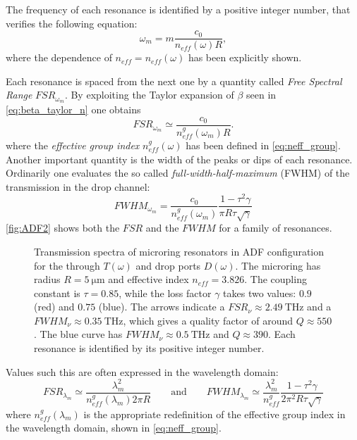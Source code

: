 The frequency of each resonance is identified by a positive integer number, that verifies the following equation:
\begin{equation}
	\omega_m = m\dfrac{c_0}{n_{eff}(\omega)R},
\end{equation}
where the dependence of $n_{eff}=n_{eff}\left(\omega\right)$ has been explicitly shown.

Each resonance is spaced from the next one by a quantity called \textit{Free Spectral Range} $FSR_{\omega_m}$.
By exploiting the Taylor expansion of $\beta$ seen in \cref{eq:beta_taylor_n} one obtains
\begin{equation}
	FSR_{\omega_m} \simeq \dfrac{c_0}{n_{eff}^g\left(\omega_m\right) R} .
\end{equation}
where the \textit{effective group index} $n_{eff}^g\left(\omega\right)$ has been defined in \cref{eq:neff_group}.
Another important quantity is the width of the peaks or dips of each resonance.
Ordinarily one evaluates the so called \textit{full-width-half-maximum} (FWHM) of the transmission in the drop channel:
\begin{equation}
	FWHM_{\omega_m} = \dfrac{c_0}{n_{eff}^g\left(\omega_m\right)}\dfrac{1- \tau^2\gamma}{\pi R \tau \sqrt{\gamma}}
\end{equation}
\autoref{fig:ADF2} shows both the $FSR$ and the $FWHM$ for a family of resonances.

\begin{figure}[htbp]
	\centering
	
	\caption{
		Transmission spectra of microring resonators in ADF configuration for the through $T(\omega)$ and drop ports $D(\omega)$.
		The microring has radius $R=\SI{5}{\um}$ and effective index $n_{eff}=3.826$.
		The coupling constant is $\tau=0.85$, while the loss factor $\gamma$ takes two values: $0.9$ (red) and $0.75$ (blue).
		The arrows indicate a $FSR_\nu \approx \SI{2.49}{\THz}$ and a $FWHM_\nu \approx \SI{0.35}{\THz}$, which gives a quality factor of around $Q \approx \num{550}$.
		The blue curve has $FWHM_\nu \approx \SI{0.5}{\THz}$ and $Q \approx \num{390}$.
		Each resonance is identified by its positive integer number.
	}
	\label{fig:ADF2}
\end{figure}

Values such this are often expressed in the wavelength domain:
\begin{equation}
	FSR_{\lambda_m} \simeq \dfrac{\lambda_m^2}{n_{eff}^g\left(\lambda_m\right) 2\pi R}
		\qquad \mathrm{and} \qquad
	FWHM_{\lambda_m} \simeq	\dfrac{\lambda_m^2}{n_{eff}^g}
													\dfrac{1- \tau^2\gamma}{2\pi^2 R \tau \sqrt{\gamma}}
\end{equation}
where $n_{eff}^g\left(\lambda_m\right)$ is the appropriate redefinition of the effective group index in the wavelength domain, shown in \cref{eq:neff_group}.

